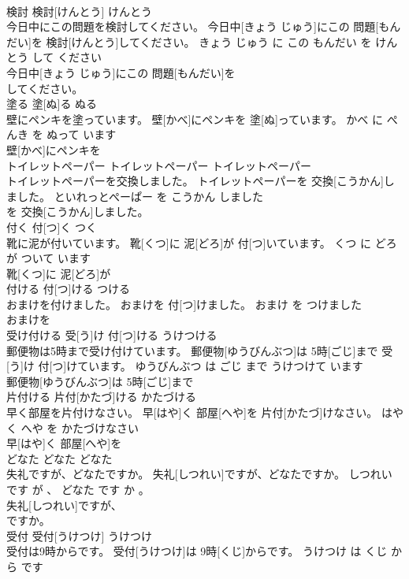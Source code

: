 \documentclass[8pt]{extreport}
\begin{document}
\begin{CJK}{UTF8}{min}
\\	検討	検討[けんとう]	けんとう	
\\	今日中にこの問題を検討してください。	今日中[きょう じゅう]にこの 問題[もんだい]を 検討[けんとう]してください。	きょう じゅう に この もんだい を けんとう して ください	
\\	今日中[きょう じゅう]にこの 問題[もんだい]を
\\	してください。			
\\	塗る	塗[ぬ]る	ぬる	
\\	壁にペンキを塗っています。	壁[かべ]にペンキを 塗[ぬ]っています。	かべ に ぺんき を ぬって います	
\\	壁[かべ]にペンキを
\\	トイレットペーパー	トイレットペーパー	トイレットペーパー	
\\	トイレットペーパーを交換しました。	トイレットペーパーを 交換[こうかん]しました。	といれっとぺーぱー を こうかん しました	
\\	を 交換[こうかん]しました。			
\\	付く	付[つ]く	つく	
\\	靴に泥が付いています。	靴[くつ]に 泥[どろ]が 付[つ]いています。	くつ に どろ が ついて います	
\\	靴[くつ]に 泥[どろ]が
\\	付ける	付[つ]ける	つける	
\\	おまけを付けました。	おまけを 付[つ]けました。	おまけ を つけました	
\\	おまけを
\\	受け付ける	受[う]け 付[つ]ける	うけつける	
\\	郵便物は5時まで受け付けています。	郵便物[ゆうびんぶつ]は 5時[ごじ]まで 受[う]け 付[つ]けています。	ゆうびんぶつ は ごじ まで うけつけて います	
\\	郵便物[ゆうびんぶつ]は 5時[ごじ]まで
\\	片付ける	片付[かたづ]ける	かたづける	
\\	早く部屋を片付けなさい。	早[はや]く 部屋[へや]を 片付[かたづ]けなさい。	はやく へや を かたづけなさい	
\\	早[はや]く 部屋[へや]を
\\	どなた	どなた	どなた	
\\	失礼ですが、どなたですか。	失礼[しつれい]ですが、どなたですか。	しつれい です が 、 どなた です か 。	
\\	失礼[しつれい]ですが、
\\	ですか。			
\\	受付	受付[うけつけ]	うけつけ	
\\	受付は9時からです。	受付[うけつけ]は 9時[くじ]からです。	うけつけ は くじ から です	

\end{CJK}
\end{document}
